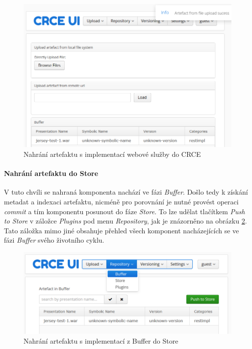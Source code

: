 \documentclass[czech,DP]{thesiskiv}
\begin{document}
\begin{figure}[h]
	\centering
	\includegraphics[width=\linewidth]{crce-art-upload.png}
	\caption{Nahrání artefaktu s implementací webové služby do CRCE}
	\label{fig:crce-art-upload}
\end{figure}

\paragraph{Nahrání artefaktu do Store}
V tuto chvíli se nahraná komponenta nachází ve fázi \textit{Buffer}. Došlo tedy k získání metadat a indexaci artefaktu, nicméně pro porovnání je nutné provést operaci \textit{commit} a tím komponentu posunout do fáze \textit{Store}. To lze udělat tlačítkem \textit{Push to Store} v záložce \textit{Plugins} pod menu \textit{Repository}, jak je znázorněno na obrázku \ref{fig:crce-art-push-to-store}. Tato záložka mimo jiné obsahuje přehled všech komponent nacházejících se ve fázi \textit{Buffer} svého životního cyklu.

\begin{figure}[h]
	\centering
	\includegraphics[width=\linewidth]{crce-art-push-to-store.png}
	\caption{Nahrání artefaktu s implementací z Buffer do Store}
	\label{fig:crce-art-push-to-store}
\end{figure}
\end{document}

